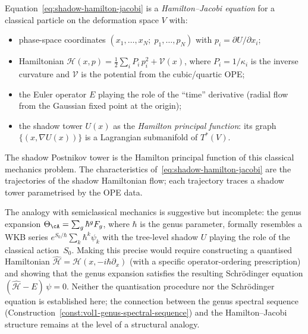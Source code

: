 \begin{remark}
\label{rem:shadow-hamiltonian}
Equation~\eqref{eq:shadow-hamilton-jacobi} is a
\emph{Hamilton--Jacobi equation} for a classical particle
on the deformation space $V$ with:
\begin{itemize}[nosep]
\item phase-space coordinates
  $(x_1, \dotsc, x_N;\; p_1, \dotsc, p_N)$
  with $p_i = \partial U / \partial x_i$;
\item Hamiltonian
  $\mathcal{H}(x, p)
  = \frac{1}{2}\sum_i P_i\,p_i^2 + \mathcal{V}(x)$,
  where $P_i = 1/\kappa_i$ is the inverse curvature and
  $\mathcal{V}$ is the potential from the cubic/quartic OPE;
\item the Euler operator $E$ playing the role of the
  ``time'' derivative (radial flow from the Gaussian
  fixed point at the origin);
\item the shadow tower $U(x)$ as the \emph{Hamilton principal
  function}: its graph $\{(x, \nabla U(x))\}$ is a
  Lagrangian submanifold of $T^*(V)$.
\end{itemize}
The shadow Postnikov tower is the Hamilton principal
function of this classical mechanics problem.  The
characteristics of~\eqref{eq:shadow-hamilton-jacobi} are
the trajectories of the shadow Hamiltonian flow; each
trajectory traces a shadow tower parametrised by the OPE data.

The analogy with semiclassical mechanics is suggestive but
incomplete: the genus expansion
$\Theta_\cA = \sum_g \hbar^g F_g$, where $\hbar$ is the
genus parameter, formally resembles a WKB series
$e^{S_0/\hbar}\sum_k \hbar^k \psi_k$ with the tree-level
shadow $U$ playing the role of the classical action~$S_0$.
Making this precise would require constructing a quantised
Hamiltonian
$\widehat{\mathcal{H}} = \mathcal{H}(x, -i\hbar\partial_x)$
(with a specific operator-ordering prescription) and showing
that the genus expansion satisfies the resulting
Schr\"odinger equation
$(\widehat{\mathcal{H}} - E)\,\psi = 0$.
Neither the quantisation procedure nor the Schr\"odinger
equation is established here; the connection between the
genus spectral sequence
(Construction~\ref{const:vol1-genus-spectral-sequence}) and
the Hamilton--Jacobi structure remains at the level of a
structural analogy.
\end{remark}


